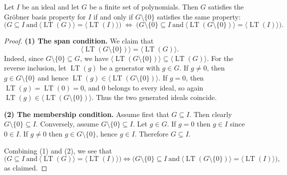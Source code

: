 \begin{lemma}\label{lem:GroebnerBasis_prop_remove_zero}
  \leanok
  Let $I$ be an ideal and let $G$ be a finite set of polynomials.
  Then $G$ satisfies the Gr\"obner basis property for $I$ if and only if $G\setminus\{0\}$
  satisfies the same property:
  \[
    \bigl(G \subseteq I \ \text{and}\ \langle \operatorname{LT}(G)\rangle = \langle \operatorname{LT}(I)\rangle\bigr)
    \;\Longleftrightarrow\;
    \bigl(G\setminus\{0\} \subseteq I \ \text{and}\ \langle \operatorname{LT}(G\setminus\{0\})\rangle = \langle \operatorname{LT}(I)\rangle\bigr).
  \]
\end{lemma}

\begin{proof}
  \leanok
  \noindent\textbf{(1) The span condition.}
  We claim that
  \[
  \langle \operatorname{LT}(G\setminus\{0\})\rangle=\langle \operatorname{LT}(G)\rangle .
  \]
  Indeed, since $G\setminus\{0\}\subseteq G$, we have
  $\langle \operatorname{LT}(G\setminus\{0\})\rangle\subseteq \langle \operatorname{LT}(G)\rangle$.
  For the reverse inclusion, let $\operatorname{LT}(g)$ be a generator with $g\in G$.
  If $g\neq 0$, then $g\in G\setminus\{0\}$ and hence $\operatorname{LT}(g)\in
  \langle \operatorname{LT}(G\setminus\{0\})\rangle$.
  If $g=0$, then $\operatorname{LT}(g)=\operatorname{LT}(0)=0$, and $0$ belongs to every ideal,
  so again $\operatorname{LT}(g)\in \langle \operatorname{LT}(G\setminus\{0\})\rangle$.
  Thus the two generated ideals coincide.
  
  \medskip
  \noindent\textbf{(2) The membership condition.}
  Assume first that $G\subseteq I$. Then clearly $G\setminus\{0\}\subseteq I$.
  Conversely, assume $G\setminus\{0\}\subseteq I$. Let $g\in G$.
  If $g=0$ then $g\in I$ since $0\in I$. If $g\neq 0$ then $g\in G\setminus\{0\}$, hence $g\in I$.
  Therefore $G\subseteq I$.
  
  \medskip
  Combining (1) and (2), we see that
  \[
  \bigl(G \subseteq I \ \text{and}\ \langle \operatorname{LT}(G)\rangle = \langle \operatorname{LT}(I)\rangle\bigr)
  \Longleftrightarrow
  \bigl(G\setminus\{0\} \subseteq I \ \text{and}\ \langle \operatorname{LT}(G\setminus\{0\})\rangle = \langle \operatorname{LT}(I)\rangle\bigr),
  \]
  as claimed.
\end{proof}

